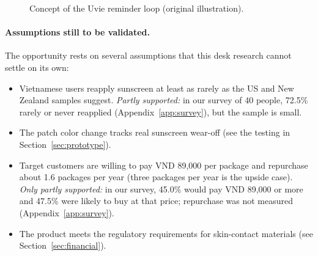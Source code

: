 \begin{figure}[ht]
  \centering
  \caption{Concept of the Uvie reminder loop (original illustration).}
  \label{fig:concept}
\end{figure}

\paragraph{Assumptions still to be validated.} The opportunity rests on several
assumptions that this desk research cannot settle on its own:
\begin{itemize}[itemsep=0pt]
  \item Vietnamese users reapply sunscreen at least as rarely as the US and New
    Zealand samples suggest. \emph{Partly supported:} in our survey of 40 people,
    72.5\% rarely or never reapplied (Appendix~\ref{app:survey}), but the sample is small.
  \item The patch color change tracks real sunscreen wear-off (see the testing in
    Section~\ref{sec:prototype}).
  \item Target customers are willing to pay VND 89,000 per package and repurchase
    about 1.6 packages per year (three packages per year is the upside case). \emph{Only partly supported:} in our survey, 45.0\% would
    pay VND 89,000 or more and 47.5\% were likely to buy at that price; repurchase was not
    measured (Appendix~\ref{app:survey}).
  \item The product meets the regulatory requirements for skin-contact materials
    (see Section~\ref{sec:financial}).
\end{itemize}
